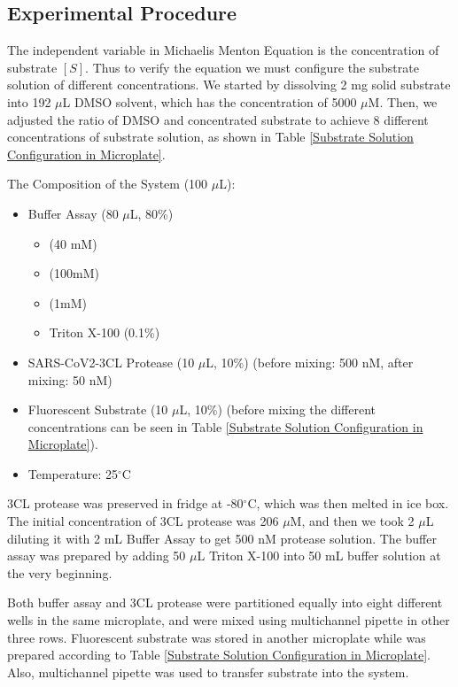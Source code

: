 \documentclass{report}
\begin{document}
\subsection{Experimental Procedure}

The independent variable in Michaelis Menton Equation is the concentration of substrate $[S]$.
Thus to verify the equation we must configure the substrate solution of different concentrations.
We started by dissolving 2 mg solid substrate into 192 $\mu$L DMSO solvent, which has the concentration of 5000 $\mu$M.
Then, we adjusted the ratio of DMSO and concentrated substrate to achieve 8 different concentrations of substrate solution, as shown in Table \ref{Substrate Solution Configuration in Microplate}.

The Composition of the System (100 $\mu$L):
\begin{itemize}
    \item Buffer Assay (80 $\mu$L, 80\%)
    \begin{itemize}
        \item {} (40 mM)
        \item {} (100mM)
        \item {} (1mM)
        \item Triton X-100 (0.1\%)
    \end{itemize}
    \item SARS-CoV2-3CL Protease (10 $\mu$L, 10\%) (before mixing: 500 nM, after mixing: 50 nM)
    \item Fluorescent Substrate (10 $\mu$L, 10\%) (before mixing the different concentrations can be seen in Table \ref{Substrate Solution Configuration in Microplate}).
    \item Temperature: 25$^\circ$C
\end{itemize}

3CL protease was preserved in fridge at -80$^\circ$C, which was then melted in ice box.
The initial concentration of 3CL protease was 206 $\mu$M, and then we took 2 $\mu$L diluting it with 2 mL Buffer Assay to get 500 nM protease solution.
The buffer assay was prepared by adding 50 $\mu$L Triton X-100 into 50 mL buffer solution at the very beginning.

Both buffer assay and 3CL protease were partitioned equally into eight different wells in the same microplate, and were mixed using multichannel pipette in other three rows.
Fluorescent substrate was stored in another microplate while was prepared according to Table \ref{Substrate Solution Configuration in Microplate}.
Also, multichannel pipette was used to transfer substrate into the system.
\end{document}
